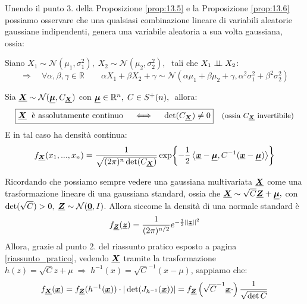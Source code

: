 Unendo il punto 3. della Proposizione \ref{prop:13.5} e la Proposizione \ref{prop:13.6} possiamo osservare che una qualsiasi combinazione lineare di variabili aleatorie gaussiane indipendenti, genera una variabile aleatoria a sua volta gaussiana, ossia: 

\medskip
Siano $X_1\sim\mathcal{N}(\mu_1, \sigma_1^2),\; X_2\sim\mathcal{N}(\mu_2, \sigma_2^2),\;$ tali che $X_1 \mathrel{\perp\!\!\!\perp} X_2$:
\[\Rightarrow\quad\forall \alpha, \beta, \gamma\in \mathbb{R}\qquad \alpha X_1 + \beta X_2 + \gamma \sim \mathcal{N}(\alpha \mu_1 + \beta \mu_2 + \gamma, \alpha^2\sigma_1^2 + \beta^2\sigma_2^2)\]

\begin{teorema}
    Sia $\underline{{\boldsymbol{X}}}\sim \mathcal{N}(\underline{{\boldsymbol{\mu}}}, C_{\underline{{\boldsymbol{X}}}})$ con $\underline{{\boldsymbol{\mu}}}\in\mathbb{R}^n, \;C\in S^+(n), \;$ allora:
    \[\boxed{\underline{{\boldsymbol{X}}} \;\text{ è assolutamente continuo}\quad \iff \quad \det(C_{\underline{{\boldsymbol{X}}}})\neq 0} \quad \small\text{(ossia $C_{\underline{{\boldsymbol{X}}}}$ invertibile)}\]
    E in tal caso ha densità continua:
    \[f_{\underline{{\boldsymbol{X}}}}(x_1, ..., x_n) = \frac{1}{\sqrt{(2\pi)^{n}\det(C_{\underline{{\boldsymbol{X}}}})}} \exp\!\left\{-\frac{1}{2}\left\langle \underline{{\boldsymbol{x}}}-\underline{{\boldsymbol{\mu}}}, C^{-1} (\underline{{\boldsymbol{x}}}-\underline{{\boldsymbol{\mu}}}) \right\rangle \right\}\]

    \begin{dimostrazione}
        Ricordando che possiamo sempre vedere una gaussiana multivariata $\underline{{\boldsymbol{X}}}$ come una trasformazione lineare di una gaussiana standard, ossia che $\underline{{\boldsymbol{X}}} \sim \sqrt{C}\underline{{\boldsymbol{Z}}} + \underline{{\boldsymbol{\mu}}}, $ con $\det(\sqrt{C})>0,\; \underline{{\boldsymbol{Z}}} \sim\mathcal{N}(\underline{{\boldsymbol{0}}}, I)$. Allora siccome la densità di una normale standard è 
        \[f_{\underline{{\boldsymbol{Z}}}}(\underline{{\boldsymbol{z}}}) = \frac{1}{(2\pi)^{n/2}} e^{-\frac{1}{2} ||\underline{{\boldsymbol{z}}}||^2}\]
        Allora, grazie al punto 2. del riassunto pratico esposto a pagina \ref{riassunto_pratico}, vedendo $\underline{{\boldsymbol{X}}}$ tramite la trasformazione $h(z) = \sqrt{C}z + \mu \;\Rightarrow\;h^{-1}(x) = \sqrt{C}^{-1}(x-\mu)$, sappiamo che:
        \[f_{\underline{{\boldsymbol{X}}}}(\underline{{\boldsymbol{x}}}) = f_{\underline{{\boldsymbol{Z}}}}(h^{-1}(\underline{{\boldsymbol{x}}})) \cdot |\det(J_{h^{-1}}(\underline{{\boldsymbol{x}}}))| = f_{\underline{{\boldsymbol{Z}}}}\left(\sqrt{C}^{-1}\underline{{\boldsymbol{x}}}\cdot\right) \frac{1}{\sqrt{\det{C}}}\]
    \end{dimostrazione}
\end{teorema}

